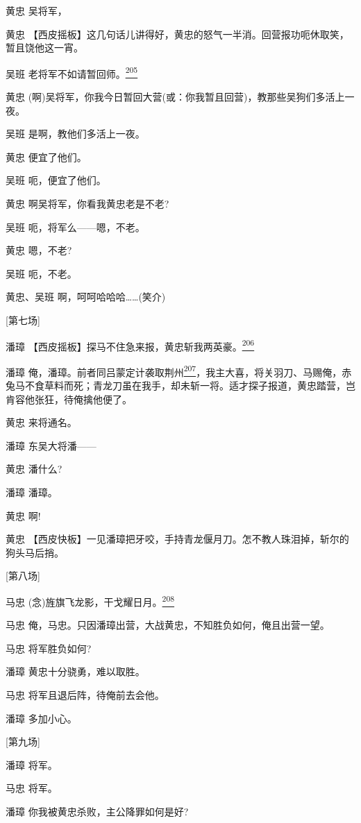 黄忠 吴将军，

黄忠
【西皮摇板】这几句话儿讲得好，黄忠的怒气一半消。回营报功呃休取笑，暂且饶他这一宵。

吴班
老将军不如请暂回师。\protect\hyperlink{fn205}{\textsuperscript{205}}

黄忠
(啊)吴将军，你我今日暂回大营(或：你我暂且回营)，教那些吴狗们多活上一夜。

吴班 是啊，教他们多活上一夜。

黄忠 便宜了他们。

吴班 呃，便宜了他们。

黄忠 啊吴将军，你看我黄忠老是不老?

吴班 呃，将军么------嗯，不老。

黄忠 嗯，不老?

吴班 呃，不老。

黄忠、吴班 啊，呵呵哈哈哈\ldots{}\ldots{}(笑介)

{[}第七场{]}

潘璋
【西皮摇板】探马不住急来报，黄忠斩我两英豪。\protect\hyperlink{fn206}{\textsuperscript{206}}

潘璋
俺，潘璋。前者同吕蒙定计袭取荆州\protect\hyperlink{fn207}{\textsuperscript{207}}，我主大喜，将关羽刀、马赐俺，赤兔马不食草料而死；青龙刀虽在我手，却未斩一将。适才探子报道，黄忠踏营，岂肯容他张狂，待俺擒他便了。

黄忠 来将通名。

潘璋 东吴大将潘------

黄忠 潘什么?

潘璋 潘璋。

黄忠 啊!

黄忠
【西皮快板】一见潘璋把牙咬，手持青龙偃月刀。怎不教人珠泪掉，斩尔的狗头马后捎。

{[}第八场{]}

马忠
(念)旌旗飞龙影，干戈耀日月。\protect\hyperlink{fn208}{\textsuperscript{208}}

马忠 俺，马忠。只因潘璋出营，大战黄忠，不知胜负如何，俺且出营一望。

马忠 将军胜负如何?

潘璋 黄忠十分骁勇，难以取胜。

马忠 将军且退后阵，待俺前去会他。

潘璋 多加小心。

{[}第九场{]}

潘璋 将军。

马忠 将军。

潘璋 你我被黄忠杀败，主公降罪如何是好?

